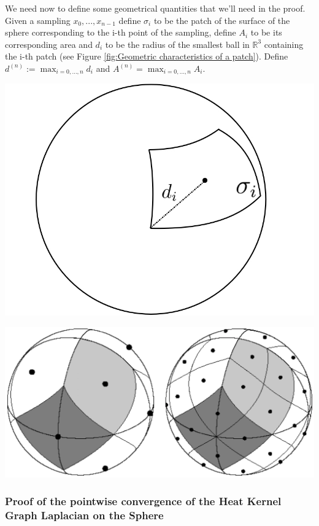 We need now to define some geometrical quantities that we'll need in the proof.
Given a sampling $x_0, ..., x_{n-1}$ define $\sigma_i$ to be the patch of the surface of the sphere corresponding to the i-th point of the sampling, define $A_i$ to be its corresponding area and $d_i$ to be the radius of the smallest ball in $\mathbb R^3$ containing the i-th patch (see Figure \ref{fig:Geometric characteristics of a patch}). Define $d^{(n)} := \max_{i=0, ..., n}d_i$ and $A^{(n)}=\max_{i=0, ..., n}A_i$.\\

\begin{minipage}{.5\textwidth}
	\centering
	\includegraphics[width=0.4\linewidth]{figs/chapter1/d_iA_i.jpg}
\end{minipage}%
\begin{minipage}{.5\textwidth}
	\centering
	\includegraphics[width=0.7\linewidth]{figs/chapter1/Heal_Base.png}
	\vspace{0.5cm}
\end{minipage}

\subsubsection{Proof of the pointwise convergence of the Heat Kernel Graph Laplacian on the Sphere}

